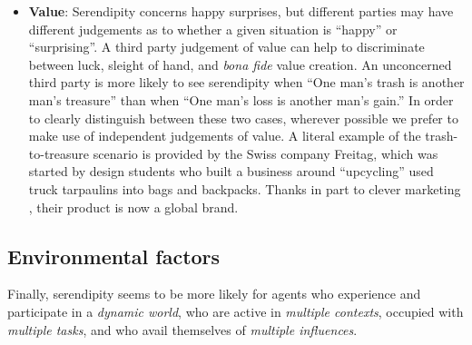 
\begin{itemize}
\item \textbf{Value}: Serendipity concerns happy surprises, but
  different parties may have different judgements as to whether a
  given situation is ``happy'' or ``surprising''.  A third party
  judgement of value can help to discriminate between luck, sleight of
  hand, and \emph{bona fide} value creation.  An unconcerned third party is more likely to see
  serendipity when ``One man's trash is another man's treasure''
  than when ``One man's loss is another man's gain.''
  In order to clearly distinguish between these two cases, wherever possible we prefer to
  make use of independent judgements of value.  A literal example of
  the trash-to-treasure scenario is provided by the Swiss company
  Freitag, which was started by design students who built a business
  around ``upcycling'' used truck tarpaulins into bags and backpacks.
  Thanks in part to clever marketing \cite[pp. 54--55,
    68--69]{russo2010companies}, their product is now a global brand.
\end{itemize}

\subsection{Environmental factors} \label{sec:environmental-factors}

Finally, serendipity seems to be more likely for agents who experience and participate in a \emph{dynamic world}, who are active in \emph{multiple contexts}, occupied with \emph{multiple tasks}, and who avail themselves of \emph{multiple influences}.

